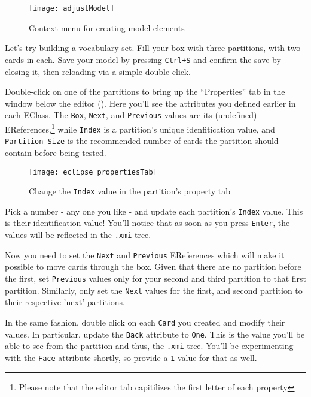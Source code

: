 \begin{stepbystep}
\begin{figure}[htbp]
	\centering
  \texttt{[image: adjustModel]}
	\caption{Context menu for creating model elements}
	\label{eclipse:create_instance}
\end{figure}

\item Let's try building a vocabulary set. Fill your box with three partitions, with two cards in each. Save your model by pressing
\texttt{Ctrl+S} and confirm the save by closing it, then reloading via a simple double-click.

\item Double-click on one of the partitions to bring up the ``Properties'' tab in the window below the editor
(). Here you'll see the attributes you defined earlier in each EClass. The \texttt{Box}, \texttt{Next}, and
\texttt{Previous} values are its (undefined) EReferences,\footnote{Please note that the editor tab capitilizes the first letter of each property} while \texttt{Index} is a
partition's unique idenfitication value, and \texttt{Partition Size} is the recommended number of cards the partition should contain before being tested.

\begin{figure}[h]
	\centering
  \texttt{[image: eclipse\_propertiesTab]}
	\caption{Change the \texttt{Index} value in the partition's property tab}
	\label{eclipse:properties_partition}
\end{figure}
\FloatBarrier

\vspace{0.5cm}

\item Pick a number - any one you like - and update each partition's \texttt{Index} value. This is their identification value! You'll
notice that as soon as you press \texttt{Enter}, the values will be reflected in the \texttt{.xmi} tree.

\item Now you need to set the \texttt{Next} and \texttt{Previous} EReferences which will make it possible to move cards through the
box. Given that there are no partition before the first, set \texttt{Previous} values only for your second and third partition to that first partition.
Similarly, only set the \texttt{Next} values for the first, and second partition to their respective 'next' partitions.

\item In the same fashion, double click on each \texttt{Card} you created and modify their values. In particular, update the
\texttt{Back} attribute to \texttt{One}. This is the value you'll be able to see from the partition and thus, the \texttt{.xmi} tree. You'll be experimenting
with the \texttt{Face} attribute shortly, so provide a \texttt{1} value for that as well.


\end{stepbystep}
